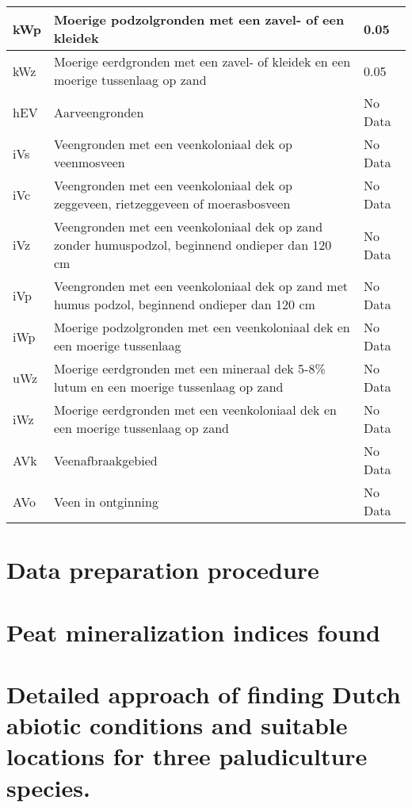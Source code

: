 \documentclass[a4paper,12pt]{scrbook}
\begin{document}
\begin{appendices}
\begin{center}
\begin{longtable}{|l| p{11cm} | l |}
kWp & Moerige podzolgronden met een zavel- of een kleidek  & 0.05 \\ \hline
kWz & Moerige eerdgronden met een zavel- of kleidek en een moerige tussenlaag op zand  & 0.05 \\ \hline
hEV & Aarveengronden  & \multicolumn{1}{l|}{No Data} \\ \hline
iVs & Veengronden met een veenkoloniaal dek op veenmosveen & \multicolumn{1}{l|}{No Data} \\ \hline
iVc & Veengronden met een veenkoloniaal dek op zeggeveen, rietzeggeveen of moerasbosveen  & \multicolumn{1}{l|}{No Data} \\ \hline
iVz & Veengronden met een veenkoloniaal dek op zand zonder humuspodzol, beginnend ondieper dan 120 cm  & \multicolumn{1}{l|}{No Data} \\ \hline
iVp & Veengronden met een veenkoloniaal dek op zand met humus podzol, beginnend ondieper dan 120 cm  & \multicolumn{1}{l|}{No Data} \\ \hline
iWp & Moerige podzolgronden met een veenkoloniaal dek en een moerige tussenlaag  & \multicolumn{1}{l|}{No Data} \\ \hline
uWz & Moerige eerdgronden met een mineraal dek 5-8\% lutum en een moerige tussenlaag op zand  & \multicolumn{1}{l|}{No Data} \\ \hline
iWz & Moerige eerdgronden met een veenkoloniaal dek en een moerige tussenlaag op zand  & \multicolumn{1}{l|}{No Data} \\ \hline
AVk & Veenafbraakgebied & \multicolumn{1}{l|}{No Data} \\ \hline
AVo & Veen in ontginning & \multicolumn{1}{l|}{No Data} \\ \hline
\end{longtable}
\end{center}

\chapter{Data preparation procedure}  \label{ann:procdataprep}

\chapter{Peat mineralization indices found} \label{ann:peatindicesstout}

\chapter{Detailed approach of finding Dutch abiotic conditions and suitable locations for three paludiculture species.}
\label{ann:procedureabiotics}


\end{appendices}
\end{document}
